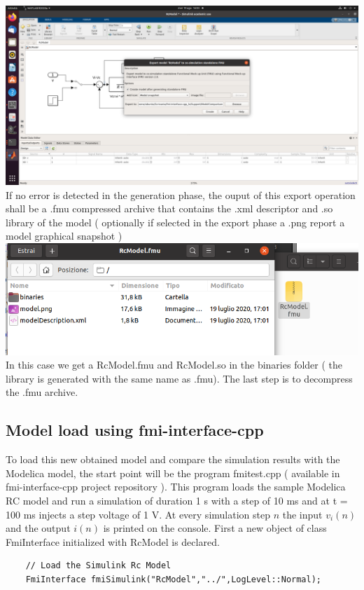 \includegraphics[width=1.0\textwidth]{FmuExport2.png}
\newline
If no error is detected in the generation phase, the ouput of this export operation shall be a .fmu compressed archive that contains the .xml descriptor and .so library of the model ( optionally if selected in the export phase a .png report a model graphical snapshot )
\newline
\newline
\includegraphics[width=1.0\textwidth]{OuputModel.png}
\newline
In this case we get a RcModel.fmu and RcModel.so in the binaries folder ( the library is generated with the same name as .fmu).
\newline
The last step is to decompress the .fmu archive.

\subsection{Model load using fmi-interface-cpp}
To load this new obtained model and compare the simulation results with the Modelica model, the start point will be the program fmitest.cpp ( available in fmi-interface-cpp project repository ). This program loads the sample Modelica RC model and run a simulation of duration 1 s with a step of 10 ms and at t = 100 ms injects a step voltage of 1 V. At every simulation step $n$ the input $v_i(n)$ and the output $i(n)$ is printed on the console.
\newline
First a new object of class FmiInterface initialized with RcModel is declared.
\begin{verbatim}
    // Load the Simulink Rc Model
    FmiInterface fmiSimulink("RcModel","../",LogLevel::Normal);
\end{verbatim}

